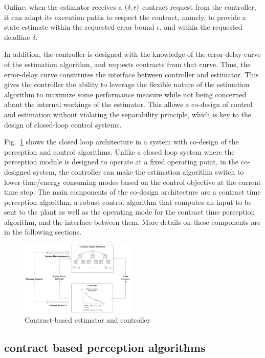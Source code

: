 Online, when the estimator receives a $(\delta,\epsilon)$ contract request from the controller, it can adapt its execution paths to respect the contract, namely, to provide a state estimate within the requested error bound $\epsilon$, and within the requested deadline $\delta$.

In addition, the controller is designed with the knowledge of the error-delay curve of the estimation algorithm, and requests contracts from that curve.
Thus, the error-delay curve constitutes the interface between controller and estimator.
This gives the controller the ability to leverage the flexible nature of the estimation algorithm to maximize some performance measure while not being concerned about the internal workings of the estimator.
This allows a co-design of control and estimation without violating the separability principle, which is key to the design of closed-loop control systems.

Fig.~\ref{fig:fullcodesignedCE} shows the closed loop architecture in a system with co-design of the perception and control algorithms.
Unlike a closed loop system where the perception module is designed to operate at a fixed operating point, in the co-designed system, the controller can make the estimation algorithm switch to lower time/energy consuming modes based on the control objective at the current time step.
The main components of the co-design architecture are a contract time perception algorithm, a robust control algorithm that computes an input to be sent to the plant as well as the operating mode for the contract time perception algorithm, and the interface between them. More details on these components are in the following sections.

\begin{figure}[t]
	\centering
	\includegraphics[width=0.49\textwidth]{figures/omnigraffle_figures/mid_level_figure2}
	\caption{Contract-based estimator and controller}
	\label{fig:fullcodesignedCE}
\end{figure}
\subsection{contract based perception algorithms}

